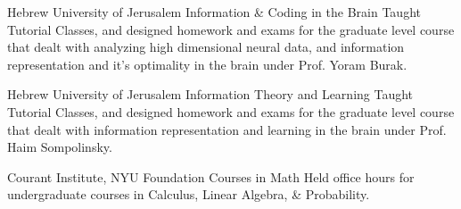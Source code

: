 {Hebrew University of Jerusalem} {Information \& Coding in the Brain} {Taught Tutorial Classes, and designed homework and exams for the graduate level
course that dealt with analyzing high dimensional neural data, and information representation and it's optimality in the brain under Prof. Yoram Burak.}

{Hebrew University of Jerusalem} {Information Theory and Learning} {Taught Tutorial Classes, and designed homework and exams for the graduate level
course that dealt with information representation and learning in the brain under Prof. Haim Sompolinsky.}

{Courant Institute, NYU} {Foundation Courses in Math} {Held office hours for undergraduate courses in Calculus, Linear
Algebra, \& Probability.}
%
%

